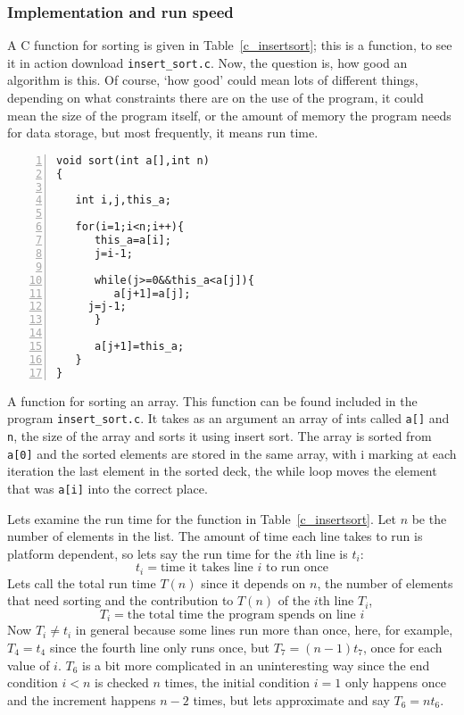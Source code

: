 \documentclass[11pt,a4paper]{scrartcl}
\begin{document}
\subsubsection*{Implementation and run speed}

A C function for sorting is given in Table~\ref{c_insertsort}; this is
a function, to see it in action download \texttt{insert\_sort.c}. Now,
the question is, how good an algorithm is this. Of course, \lq{}how
good\rq{} could mean lots of different things, depending on what
constraints there are on the use of the program, it could mean the
size of the program itself, or the amount of memory the program needs
for data storage, but most frequently, it means run time.


\begin{table}
\begin{lstlisting}[numbers=left]
void sort(int a[],int n)
{

   int i,j,this_a;

   for(i=1;i<n;i++){
      this_a=a[i];
      j=i-1;

      while(j>=0&&this_a<a[j]){
         a[j+1]=a[j];
	 j=j-1;
      }

      a[j+1]=this_a;
   }
}
\end{lstlisting}
\caption{A function for sorting an array. This function can be found
  included in the program \texttt{insert\_sort.c}. It takes as an
  argument an array of ints called \texttt{a[]} and \texttt{n}, the
  size of the array and sorts it using insert sort. The array is
  sorted from \texttt{a[0]} and the sorted elements are stored in the
  same array, with i marking at each iteration the last element in the
  sorted deck, the while loop moves the element that was \texttt{a[i]}
  into the correct place.\label{c_insertsort}}
\end{table}

Lets examine the run time for the function in
Table~\ref{c_insertsort}. Let $n$ be the number of elements in the
list. The amount of time each line takes to run is platform dependent,
so lets say the run time for the $i$th line is $t_i$:
\begin{equation}
t_i=\mbox{time it takes line }i\mbox{ to run once}
\end{equation}
Lets call the total run time $T(n)$ since it depends on $n$, the
number of elements that need sorting and the contribution to $T(n)$ of
the $i$th line $T_i$, 
\begin{equation}
T_i=\mbox{the total time the program spends on line }i
\end{equation}
Now $T_i\not= t_i$ in general because some lines run more than once,
here, for example, $T_4=t_4$ since the fourth line only runs once, but
$T_7=(n-1)t_7$, once for each value of $i$. $T_6$ is a bit more
complicated in an uninteresting way since the end condition $i<n$ is
checked $n$ times, the initial condition $i=1$ only happens once and
the increment happens $n-2$ times, but lets approximate and say
$T_6=nt_6$.
\end{document}

